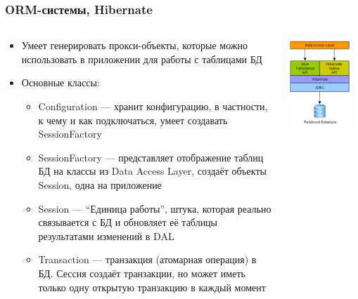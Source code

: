 \documentclass[xetex,mathserif,serif]{beamer}
\begin{document}
	\begin{frame}
		\frametitle{ORM-системы, Hibernate}
		\begin{columns}
			\begin{column}{0.75\textwidth}
				\begin{itemize}
					\item Умеет генерировать прокси-объекты, которые можно использовать в приложении для работы с таблицами БД
					\item Основные классы:
					\begin{itemize}
						\item Configuration --- хранит конфигурацию, в частности, к чему и как подключаться, умеет создавать SessionFactory
						\item SessionFactory --- представляет отображение таблиц БД на классы из Data Access Layer, создаёт объекты Session, одна на приложение
						\item Session --- ``Единица работы'', штука, которая реально связывается с БД и обновляет её таблицы результатами изменений в DAL
						\item Transaction --- транзакция (атомарная операция) в БД. Сессия создаёт транзакции, но может иметь только одну открытую транзакцию в каждый момент
					\end{itemize}
				\end{itemize}
			\end{column}
			\begin{column}{0.25\textwidth}
				\begin{center}
					\includegraphics[width=0.9\textwidth]{hibernate.png}

\end{center}
\end{column}
\end{columns}
\end{frame}
\end{document}
